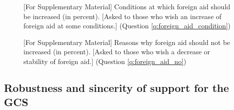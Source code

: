 \begin{figure}[h!]
  \caption[Conditions at which foreign aid should be increased]{[For Supplementary Material] Conditions at which foreign aid should be increased (in percent). [Asked to those who wish an increase of foreign aid at some conditions.] (Question \ref{q:foreign_aid_condition})}\label{fig:foreign_aid_condition}
\end{figure}

\begin{figure}[h!]
  \caption[Reasons why foreign aid should not be increased]{[For Supplementary Material] Reasons why foreign aid should not be increased (in percent). [Asked to those who wish a decrease or stability of foreign aid.] (Question \ref{q:foreign_aid_no})}\label{fig:foreign_aid_no}
\end{figure}




\subsection{Robustness and sincerity of support for the GCS}\label{subsec:robustness_sincerity}


